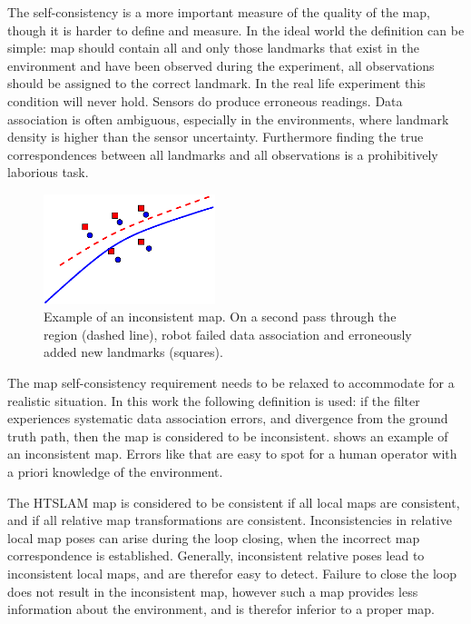 The self-consistency is a more important measure of the quality of the
map, though it is harder to define and measure. In the ideal world the
definition can be simple: map should contain all and only those
landmarks that exist in the environment and have been observed during
the experiment, all observations should be assigned to the correct
landmark. In the real life experiment this condition will never hold.
Sensors do produce erroneous readings. Data association is often
ambiguous, especially in the environments, where landmark density is
higher than the sensor uncertainty. Furthermore finding the true
correspondences between all landmarks and all observations is a
prohibitively laborious task.

\begin{figure}[htbp]
  \centering
  \includegraphics[width=5cm]{Pics/fig_inconsistent_map}
  \caption{Example of an inconsistent map. On a second pass through
    the region (dashed line), robot failed data association and
    erroneously added new landmarks (squares).}
  \label{fig:inconsistent_map}
\end{figure}


The map self-consistency requirement needs to be relaxed to accommodate
for a realistic situation. In this work the following definition is
used: if the filter experiences systematic data association errors,
and divergence from the ground truth path, then the map is considered
to be inconsistent.  shows an example
of an inconsistent map. Errors like that are easy to spot for a human
operator with a priori knowledge of the environment.

The HTSLAM map is considered to be consistent if all local maps are
consistent, and if all relative map transformations are consistent.
Inconsistencies in relative local map poses can arise during the loop
closing, when the incorrect map correspondence is established.
Generally, inconsistent relative poses lead to inconsistent local
maps, and are therefor easy to detect. Failure to close the loop does
not result in the inconsistent map, however such a map provides less
information about the environment, and is therefor inferior to a
proper map.

